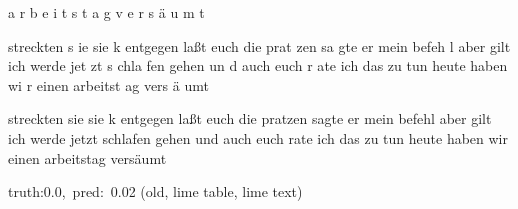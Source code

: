 \documentclass[a4paper,10pt,twoside]{article}
\begin{document}
{\color[rgb]{0.0,0,0} a}{\color[rgb]{0.0,0,0} r}{\color[rgb]{0.0,0,0} b}{\color[rgb]{0.0,0,0} e}{\color[rgb]{0.0,0,0} i}{\color[rgb]{0.0,0,0} t}{\color[rgb]{0.0,0,0} s}{\color[rgb]{0.0,0,0} t}{\color[rgb]{0.0,0,0} a}{\color[rgb]{0.0,0,0} g} {\color[rgb]{0.0,0,0} v}{\color[rgb]{0.0,0,0} e}{\color[rgb]{0.0,0,0} r}{\color[rgb]{0.0,0,0} s}{\color[rgb]{0.0,0,0} ä}{\color[rgb]{0.0,0,0} u}{\color[rgb]{0.0,0,0} m}{\color[rgb]{0.0,0,0} t} 

 streckten s{\color[rgb]{0,0,1} i}e sie k  entgegen   laßt euch die {\color[rgb]{1,0,0} p}rat{\color[rgb]{0,0,1} z}en   sa{\color[rgb]{1,0,0} g}te er   {\color[rgb]{0,0,1} m}ein befeh{\color[rgb]{1,0,0} l} aber {\color[rgb]{1,0,0} g}ilt  ich {\color[rgb]{0,0,1} w}erde jet{\color[rgb]{0,0,1} z}t s{\color[rgb]{0,0,1} c}hla{\color[rgb]{1,0,0} f}en gehen un{\color[rgb]{0,0,1} d} auch euch r{\color[rgb]{1,0,0} a}te ich  das zu tun  heute haben wi{\color[rgb]{0,0,1} r} einen arbeitst{\color[rgb]{0,0,1} a}g {\color[rgb]{1,0,0} v}ers{\color[rgb]{0,0,1} ä}{\color[rgb]{0,0,1} u}mt 

  streckten sie sie k {\color[rgb]{0,0,1} entgegen} laßt {\color[rgb]{0,0,1} euch} die pratzen sagte {\color[rgb]{0,0,1} er} mein befehl aber gilt ich werde jetzt schlafen gehen und auch euch rate ich das zu tun {\color[rgb]{0,0,1} heute} {\color[rgb]{0,0,1} haben} wir einen arbeitstag versäumt 

 {\footnotesize {\color[rgb]{0.6, 0.6, 0.6}truth:0.0,~pred:~0.02}} (old, lime table, lime text)\hrulefill
\end{document}
